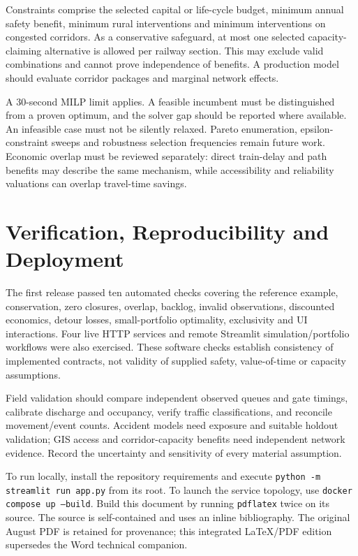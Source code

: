 \documentclass[11pt,a4paper]{article}
\begin{document}
Constraints comprise the selected capital or life-cycle budget, minimum annual safety benefit, minimum rural interventions and minimum interventions on congested corridors. As a conservative safeguard, at most one selected capacity-claiming alternative is allowed per railway section. This may exclude valid combinations and cannot prove independence of benefits. A production model should evaluate corridor packages and marginal network effects.

A 30-second MILP limit applies. A feasible incumbent must be distinguished from a proven optimum, and the solver gap should be reported where available. An infeasible case must not be silently relaxed. Pareto enumeration, epsilon-constraint sweeps and robustness selection frequencies remain future work. Economic overlap must be reviewed separately: direct train-delay and path benefits may describe the same mechanism, while accessibility and reliability valuations can overlap travel-time savings.

\section{Verification, Reproducibility and Deployment}
The first release passed ten automated checks covering the reference example, conservation, zero closures, overlap, backlog, invalid observations, discounted economics, detour losses, small-portfolio optimality, exclusivity and UI interactions. Four live HTTP services and remote Streamlit simulation/portfolio workflows were also exercised. These software checks establish consistency of implemented contracts, not validity of supplied safety, value-of-time or capacity assumptions.

Field validation should compare independent observed queues and gate timings, calibrate discharge and occupancy, verify traffic classifications, and reconcile movement/event counts. Accident models need exposure and suitable holdout validation; GIS access and corridor-capacity benefits need independent network evidence. Record the uncertainty and sensitivity of every material assumption.

To run locally, install the repository requirements and execute \texttt{python -m streamlit run app.py} from its root. To launch the service topology, use \texttt{docker compose up --build}. Build this document by running \texttt{pdflatex} twice on its source. The source is self-contained and uses an inline bibliography. The original August PDF is retained for provenance; this integrated LaTeX/PDF edition supersedes the Word technical companion.
\end{document}
